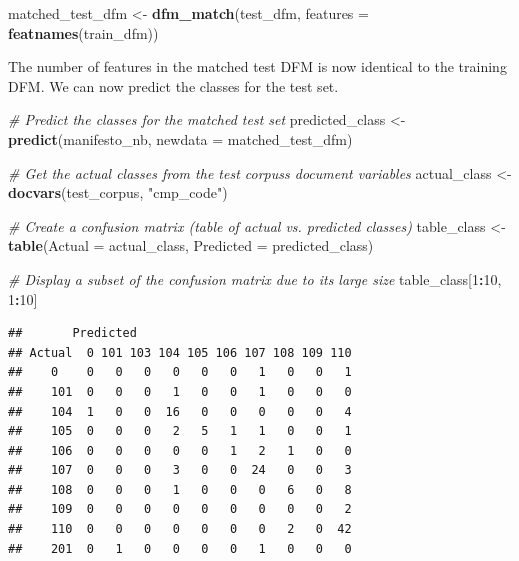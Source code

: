 \documentclass[
]{book}
\newenvironment{Shaded}{\begin{snugshade}}{\end{snugshade}}
\newcommand{\AttributeTok}[1]{\textcolor[rgb]{0.13,0.29,0.53}{#1}}
\newcommand{\CommentTok}[1]{\textcolor[rgb]{0.56,0.35,0.01}{\textit{#1}}}
\newcommand{\DecValTok}[1]{\textcolor[rgb]{0.00,0.00,0.81}{#1}}
\newcommand{\FunctionTok}[1]{\textcolor[rgb]{0.13,0.29,0.53}{\textbf{#1}}}
\newcommand{\NormalTok}[1]{#1}
\newcommand{\OtherTok}[1]{\textcolor[rgb]{0.56,0.35,0.01}{#1}}
\newcommand{\SpecialCharTok}[1]{\textcolor[rgb]{0.81,0.36,0.00}{\textbf{#1}}}
\newcommand{\StringTok}[1]{\textcolor[rgb]{0.31,0.60,0.02}{#1}}
\begin{document}
\begin{Shaded}
\begin{Highlighting}[]
\NormalTok{matched\_test\_dfm }\OtherTok{\textless{}{-}} \FunctionTok{dfm\_match}\NormalTok{(test\_dfm, }\AttributeTok{features =} \FunctionTok{featnames}\NormalTok{(train\_dfm))}
\end{Highlighting}
\end{Shaded}

The number of features in the matched test DFM is now identical to the training DFM. We can now predict the classes for the test set.

\begin{Shaded}
\begin{Highlighting}[]
\CommentTok{\# Predict the classes for the matched test set}
\NormalTok{predicted\_class }\OtherTok{\textless{}{-}} \FunctionTok{predict}\NormalTok{(manifesto\_nb, }\AttributeTok{newdata =}\NormalTok{ matched\_test\_dfm)}

\CommentTok{\# Get the actual classes from the test corpus\textquotesingle{}s document variables}
\NormalTok{actual\_class }\OtherTok{\textless{}{-}} \FunctionTok{docvars}\NormalTok{(test\_corpus, }\StringTok{"cmp\_code"}\NormalTok{)}

\CommentTok{\# Create a confusion matrix (table of actual vs. predicted classes)}
\NormalTok{table\_class }\OtherTok{\textless{}{-}} \FunctionTok{table}\NormalTok{(}\AttributeTok{Actual =}\NormalTok{ actual\_class, }\AttributeTok{Predicted =}\NormalTok{ predicted\_class)}

\CommentTok{\# Display a subset of the confusion matrix due to its large size}
\NormalTok{table\_class[}\DecValTok{1}\SpecialCharTok{:}\DecValTok{10}\NormalTok{, }\DecValTok{1}\SpecialCharTok{:}\DecValTok{10}\NormalTok{]}
\end{Highlighting}
\end{Shaded}

\begin{verbatim}
##       Predicted
## Actual  0 101 103 104 105 106 107 108 109 110
##    0    0   0   0   0   0   0   1   0   0   1
##    101  0   0   0   1   0   0   1   0   0   0
##    104  1   0   0  16   0   0   0   0   0   4
##    105  0   0   0   2   5   1   1   0   0   1
##    106  0   0   0   0   0   1   2   1   0   0
##    107  0   0   0   3   0   0  24   0   0   3
##    108  0   0   0   1   0   0   0   6   0   8
##    109  0   0   0   0   0   0   0   0   0   2
##    110  0   0   0   0   0   0   0   2   0  42
##    201  0   1   0   0   0   0   1   0   0   0
\end{verbatim}
\end{document}
